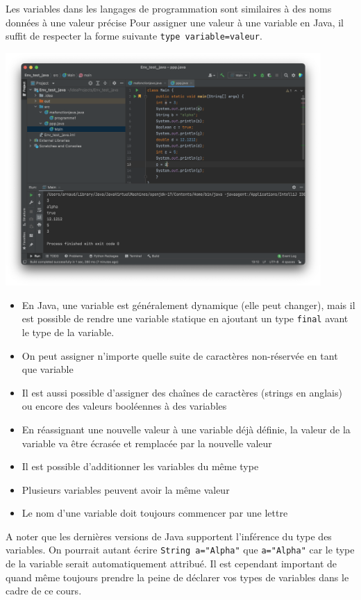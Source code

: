 Les variables dans les langages de programmation sont similaires à des noms données à une valeur précise
Pour assigner une valeur à une variable en Java, il suffit de respecter la forme suivante \lstinline{type variable=valeur}.

\begin{center}
\includegraphics[width=12cm]{variables}	
\end{center}

\begin{conseil}
\begin{itemize}
	\item En Java, une variable est généralement dynamique (elle peut changer), mais il est possible de rendre une variable statique en ajoutant un type \lstinline{final} avant le type de la variable.
	\item On peut assigner n'importe quelle suite de caractères non-réservée en tant que variable
	\item Il est aussi possible d'assigner des chaînes de caractères (strings en anglais) ou encore des valeurs booléennes à des variables
	\item En réassignant une nouvelle valeur à une variable déjà définie, la valeur de la variable va être écrasée et remplacée par la nouvelle valeur
	\item Il est possible d'additionner les variables du même type
	\item Plusieurs variables peuvent avoir la même valeur
	\item Le nom d'une variable doit toujours commencer par une lettre
\end{itemize}

\end{conseil}
A noter que les dernières versions de Java supportent l'inférence du type des variables. On pourrait autant écrire \lstinline{String a="Alpha"} que \lstinline{a="Alpha"}  car le type de la variable serait automatiquement attribué. Il est cependant important de quand même toujours prendre la peine de déclarer vos types de variables dans le cadre de ce cours.

